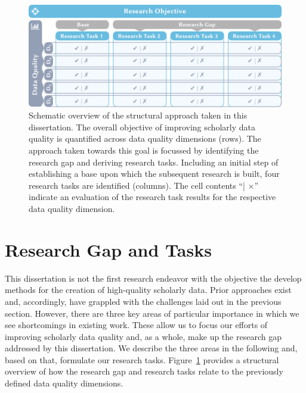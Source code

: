 
\begin{figure}[h]
  \centering
  \includegraphics[width=\linewidth]{figures/introduction/objective_dq_grid}
  \caption[Schematic overview of the structural approach taken in this dissertation]{Schematic overview of the structural approach taken in this dissertation. The overall objective of improving scholarly data quality is quantified across data quality dimensions (rows). The approach taken towards this goal is focussed by identifying the research gap and deriving research tasks. Including an initial step of establishing a base upon which the subsequent research is built, four research tasks are identified (columns). The cell contents ``\checkmark | $\times$'' indicate an evaluation of the research task results for the respective data quality dimension.}
  \label{fig:introduction-obj-dq-grid}
\end{figure}

\section{Research Gap and Tasks}\label{sec:intro-gap}


This dissertation is not the first research endeavor with the objective the develop methods for the creation of high-quality scholarly data. Prior approaches exist and, accordingly, have grappled with the challenges laid out in the previous section.
However, there are three key areas of particular importance in which we see shortcomings in existing work. These allow us to focus our efforts of improving scholarly data quality and, as a whole, make up the research gap addressed by this dissertation.
We describe the three areas in the following and, based on that, formulate our research tasks. Figure~\ref{fig:introduction-obj-dq-grid} provides a structural overview of how the research gap and research tasks relate to the previously defined data quality dimensions.

